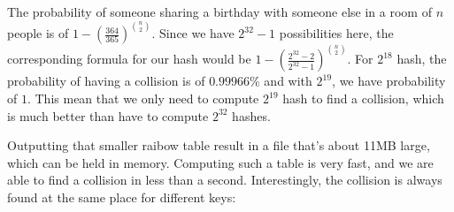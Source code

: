 \documentclass[4apaper]{report}
\begin{document}
The probability of someone sharing a birthday with someone else in a room of $n$ people is of $1 - (\frac {364}{365})^{\binom {n}{2}}$. Since we have $2^{32}-1$ possibilities here, the corresponding formula for our hash would be  $1 - (\frac {2^{32}-2}{2^{32}-1})^{\binom {n}{2}}$. For $2^{18}$ hash, the probability of having a collision is of $0.99966\%$ and with $2^{19}$, we have probability of $1$. This mean that we only need to compute $2^19$ hash to find a collision, which is much better than have to compute $2^{32}$ hashes.

Outputting that smaller raibow table result in a file that's about 11MB large, which can be held in memory. Computing such a table is very fast, and we are able to find a collision in less than a second. Interestingly, the collision is always found at the same place for different keys: 
\end{document}
